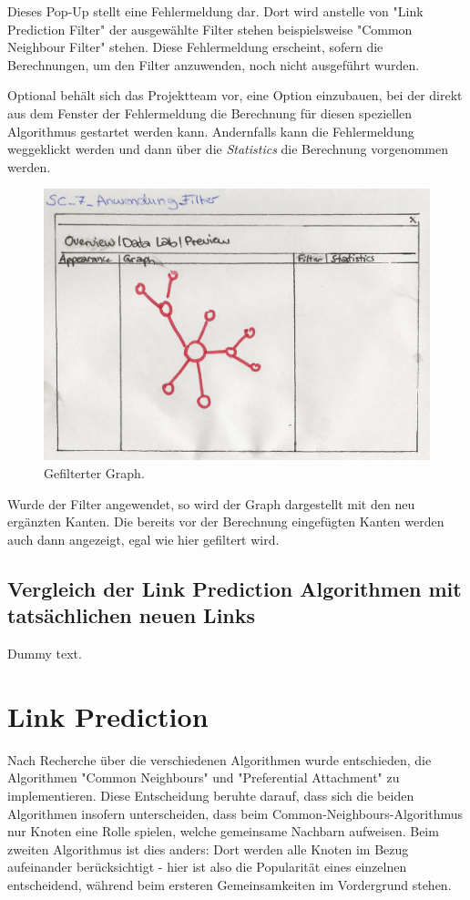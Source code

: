 Dieses Pop-Up stellt eine Fehlermeldung dar. Dort wird anstelle von "Link Prediction Filter" der ausgewählte Filter
stehen beispielsweise "Common Neighbour Filter" stehen. Diese Fehlermeldung erscheint, sofern die Berechnungen, um den
Filter anzuwenden, noch nicht ausgeführt wurden.

Optional behält sich das Projektteam vor, eine Option einzubauen, bei der direkt aus dem Fenster der Fehlermeldung die
Berechnung für diesen speziellen Algorithmus gestartet werden kann. Andernfalls kann die Fehlermeldung weggeklickt
werden und dann über die \textit{Statistics} die Berechnung vorgenommen werden.

\begin{figure}[htbp]
    \includegraphics[width=\linewidth]{resources/SC-7.png}
    \caption{Gefilterter Graph.}
    \label{fig:screen7}
\end{figure}

Wurde der Filter angewendet, so wird der Graph dargestellt mit den neu ergänzten Kanten. Die bereits vor der Berechnung
eingefügten Kanten werden auch dann angezeigt, egal wie hier gefiltert wird.

\subsection{Vergleich der Link Prediction Algorithmen mit tatsächlichen neuen Links}

Dummy text.

\section{Link Prediction}
Nach Recherche über die verschiedenen Algorithmen wurde entschieden, die Algorithmen "Common Neighbours" und
"Preferential Attachment" zu implementieren. Diese Entscheidung beruhte darauf, dass sich die beiden Algorithmen
insofern unterscheiden, dass beim Common-Neighbours-Algorithmus nur Knoten eine Rolle spielen, welche gemeinsame
Nachbarn aufweisen. Beim zweiten Algorithmus ist dies anders: Dort werden alle Knoten im Bezug aufeinander
berücksichtigt - hier ist also die Popularität eines einzelnen entscheidend, während beim ersteren Gemeinsamkeiten im
Vordergrund stehen.

